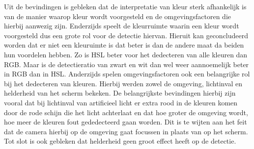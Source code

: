  
Uit de bevindingen is gebleken dat de interpretatie van kleur sterk afhankelijk is van de manier waarop kleur wordt voorgesteld en de omgevingsfactoren die hierbij aanwezig zijn. Enderzijds speelt de kleurruimte waarin een kleur wordt voorgesteld dus een grote rol voor de detectie hiervan. Hieruit kan geconcludeerd worden dat er niet een kleuruimte is dat beter is dan de andere maat da beiden hun voordelen hebben. Zo is HSL beter voor het dedecteren van alle kleuren dan RGB. Maar is de detectieratio van zwart en wit dan wel weer aannoemelijk beter in RGB dan in HSL. Anderzijds spelen omgevingsfactoren ook een belangrijke rol bij het dedecteren van kleuren. Hierbij werden zowel de omgeving, lichtinval en helderheid van het scherm bekeken. De belangrijkste bevindingen hierbij zijn vooral dat bij lichtinval van artificieel licht er extra rood in de kleuren komen door de rode schijn die het licht achterlaat en dat hoe groter de omgeving wordt, hoe meer de kleuren fout gededecteerd gaan worden. Dit is te wijten aan het feit dat de camera hierbij op de omgeving gaat focussen in plaats van op het scherm. Tot slot is ook gebleken dat helderheid geen groot effect heeft op de detectie.